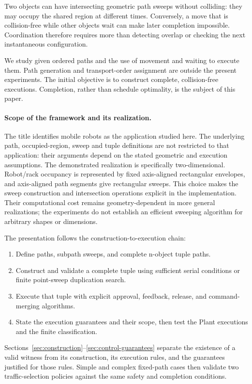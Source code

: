 \documentclass[11pt,a4paper]{article}
\theoremstyle{remark}
\newcounter{algorithm}
\begin{document}
Two objects can have intersecting geometric path sweeps without colliding:
they may occupy the shared region at different times. Conversely, a move
that is collision-free while other objects wait can make later completion
impossible. Coordination therefore requires more than detecting overlap or
checking the next instantaneous configuration.

We study given ordered paths and the use of movement and waiting to execute
them. Path generation and transport-order assignment are outside the present
experiments. The initial objective is to construct complete, collision-free
executions. Completion, rather than schedule optimality, is the subject of this paper.

\paragraph{Scope of the framework and its realization.}
The title identifies mobile robots as the application studied here.
The underlying path, occupied-region, sweep and tuple definitions are not
restricted to that application: their arguments depend on the stated
geometric and execution assumptions. The demonstrated realization is
specifically two-dimensional. Robot/rack occupancy is represented by fixed
axis-aligned rectangular envelopes, and axis-aligned path segments give
rectangular sweeps. This choice makes the sweep construction and intersection
operations explicit in the implementation. Their computational cost remains
geometry-dependent in more general realizations; the experiments do not
establish an efficient sweeping algorithm for arbitrary shapes or dimensions.

The presentation follows the construction-to-execution chain:
\begin{enumerate}
\item Define paths, subpath sweeps, and complete n-object tuple paths.
\item Construct and validate a complete tuple using sufficient serial
      conditions or finite point-sweep duplication search.
\item Execute that tuple with explicit approval, feedback, release, and
      command-merging algorithms.
\item State the execution guarantees and their scope, then test the Plant
      executions and the finite classification.
\end{enumerate}
Sections~\ref{sec:construction}--\ref{sec:control-guarantees} separate the
existence of a valid witness from its construction, its execution rules,
and the guarantees justified for those rules. Simple and complex fixed-path
cases then validate two traffic-selection policies against the same safety
and completion conditions.
\end{document}
